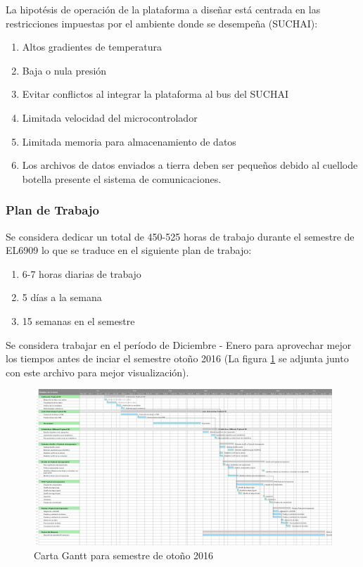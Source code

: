 \documentclass[11pt,letterpaper]{article}
\begin{document}
La hipot\'esis de operación de la plataforma a diseñar está centrada en las restricciones impuestas por el ambiente donde se desempeña (SUCHAI):
\begin{enumerate}
\item Altos gradientes de temperatura
\item Baja o nula presión
\item Evitar conflictos al integrar la plataforma al bus del SUCHAI
\item Limitada velocidad del microcontrolador
\item Limitada memoria para almacenamiento de datos
\item Los archivos de datos enviados a tierra deben ser pequeños debido al cuellode botella presente el sistema de comunicaciones.
\end{enumerate}

\subsubsection{Plan de Trabajo}
Se considera dedicar un total de 450-525 horas de trabajo durante el semestre de EL6909 lo que se traduce en el siguiente plan de trabajo:
\begin{enumerate}
\item 6-7 horas diarias de trabajo
\item 5 días a la semana
\item 15 semanas en el semestre
\end{enumerate}

Se considera trabajar en el período de Diciembre - Enero para aprovechar mejor los tiempos antes de inciar el semestre otoño 2016 (La figura \ref{gantt} se adjunta junto con este archivo para mejor visualización).

\begin{figure}[ht!]
\centering
\includegraphics[width=\textwidth]{img/gantt2.png}
\caption{Carta Gantt para semestre de otoño 2016}
\label{gantt}
\end{figure}
\end{document}
